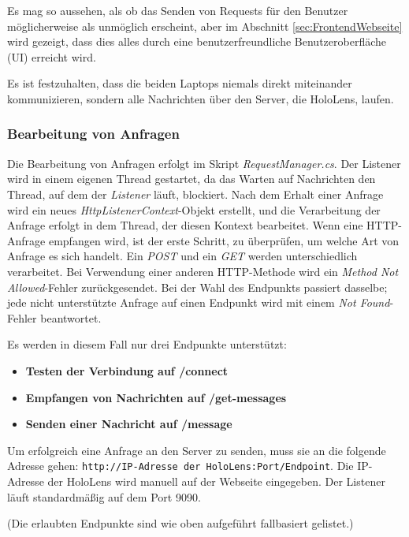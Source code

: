 Es mag so aussehen, als ob das Senden von Requests für den Benutzer möglicherweise als unmöglich erscheint, aber im Abschnitt \ref{sec:FrontendWebseite} wird gezeigt, dass dies alles durch eine benutzerfreundliche Benutzeroberfläche (UI) erreicht wird.

Es ist festzuhalten, dass die beiden Laptops niemals direkt miteinander kommunizieren, sondern alle Nachrichten über den Server, die HoloLens, laufen.

\subsubsection{\label{sec:server}Bearbeitung von Anfragen}
Die Bearbeitung von Anfragen erfolgt im Skript \textit{RequestManager.cs}. Der Listener wird in einem eigenen Thread gestartet, da das Warten auf Nachrichten den Thread, auf dem der \textit{Listener} läuft, blockiert. Nach dem Erhalt einer Anfrage wird ein neues \textit{HttpListenerContext}-Objekt erstellt, und die Verarbeitung der Anfrage erfolgt in dem Thread, der diesen Kontext bearbeitet. Wenn eine HTTP-Anfrage empfangen wird, ist der erste Schritt, zu überprüfen, um welche Art von Anfrage es sich handelt. Ein \textit{POST} und ein \textit{GET} werden unterschiedlich verarbeitet. Bei Verwendung einer anderen HTTP-Methode wird ein \textit{Method Not Allowed}-Fehler zurückgesendet. Bei der Wahl des Endpunkts passiert dasselbe; jede nicht unterstützte Anfrage auf einen Endpunkt wird mit einem \textit{Not Found}-Fehler beantwortet.

Es werden in diesem Fall nur drei Endpunkte unterstützt:

\begin{itemize}
    \item \textbf{Testen der Verbindung auf /connect}
    \item \textbf{Empfangen von Nachrichten auf /get-messages}
    \item \textbf{Senden einer Nachricht auf /message}
\end{itemize}

Um erfolgreich eine Anfrage an den Server zu senden, muss sie an die folgende Adresse
gehen: \texttt{http://{IP-Adresse der HoloLens}:{Port}/{Endpoint}}. Die IP-Adresse der HoloLens wird manuell auf der
Webseite eingegeben. Der Listener läuft standardmäßig auf dem Port 9090.

(Die erlaubten Endpunkte sind wie oben aufgeführt fallbasiert gelistet.)

